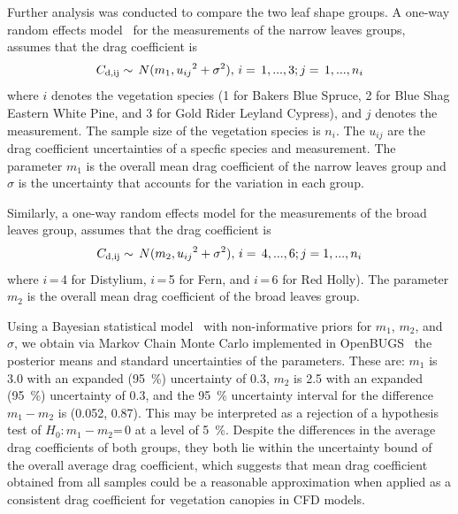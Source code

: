 \documentclass[12pt]{article}
\begin{document}
Further analysis was conducted to compare the two leaf shape groups. A one-way random effects model~\cite{Toman2009} for the measurements of the narrow leaves groups, assumes that the drag coefficient is
\begin{equation}
\label{eq:NarrowLeavesDragCoefficient}
C_{\rm d,ij}\sim\,N(m_{1},{u_{ij}}^2+{\sigma}^2),\, i=\, 1,...,3; j=\, 1,...,n_{i}
\end{equation} 
where $i$ denotes the vegetation species (1 for Bakers Blue Spruce, 2 for Blue Shag Eastern White Pine, and 3 for Gold Rider Leyland Cypress), and $j$ denotes the measurement. The sample size of the vegetation species is $n_{i}$. The $u_{ij}$ are the drag coefficient uncertainties of a specfic species and measurement. The parameter $m_{1}$ is the overall mean drag coefficient of the narrow leaves group and $\sigma$ is the uncertainty that accounts for the variation in each group.

Similarly, a one-way random effects model for the measurements of the broad leaves group, assumes that the drag coefficient is
\begin{equation}
\label{eq:BroadLeavesDragCoefficient}
C_{\rm d,ij}\sim\,N(m_{2},{u_{ij}}^2+{\sigma}^2),\, i=\, 4,...,6; j = 1,...,n_{i}
\end{equation} 
where $i$\,=\,4 for Distylium, $i$\,=\,5 for Fern, and $i$\,=\,6 for Red Holly). The parameter $m_{2}$ is the overall mean drag coefficient of the broad leaves group.

Using a Bayesian statistical model~\cite{Gelman2008} with non-informative priors for $m_{1}$, $m_{2}$, and $\sigma$, we obtain via Markov Chain Monte Carlo implemented in OpenBUGS~\cite{Lunn2009} the posterior means and standard uncertainties of the parameters. These are: $m_{1}$ is 3.0 with an expanded (95~\%) uncertainty of 0.3, $m_{2}$ is 2.5 with an expanded (95~\%) uncertainty of 0.3, and the 95~\% uncertainty interval for the difference $m_{1}-m_{2}$ is (0.052, 0.87). This may be interpreted as a rejection of a hypothesis test of $H_{0}$:\,$m_{1}-m_{2}$=\,0 at a level of 5~\%. Despite the differences in the average drag coefficients of both groups, they both lie within the uncertainty bound of the overall average drag coefficient, which suggests that mean drag coefficient obtained from all samples could be a reasonable approximation when applied as a consistent drag coefficient for vegetation canopies in CFD models. 
\end{document}
